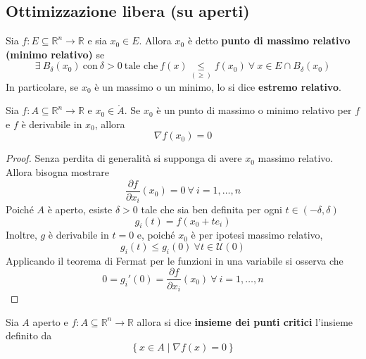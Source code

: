 \subsection{Ottimizzazione libera (su aperti)}
\begin{definition} \label{Def: Max e min relativo}
    Sia $f:E \subseteq \mathbb{R}^n \to \mathbb{R}$ e sia $x_0 \in E$. Allora $x_0$ è detto \textbf{punto di massimo relativo (minimo relativo)} se
    \begin{equation}
        \exists\ B_\delta(x_0)\ \text{con}\ \delta>0\ \text{tale che}\ f(x) \underset{(\geq)}{\leq} f(x_0)\ \forall\ x \in E \cap B_\delta(x_0)
    \end{equation}
    In particolare, se $x_0$ è un massimo o un minimo, lo si dice \textbf{estremo relativo}.
\end{definition}
\begin{theorem}
Sia $f:A \subseteq \mathbb{R}^n  \to \mathbb{R}$ e $x_0 \in \mathring{A}$. Se $x_0$ è un punto di massimo o minimo relativo per $f$ e $f$ è derivabile in $x_0$, allora
\begin{equation}
    \nabla f(x_0)=0
\end{equation}
\begin{proof}
    Senza perdita di generalità si supponga di avere $x_0$ massimo relativo. Allora bisogna mostrare
    \begin{equation}
        \frac{\partial f}{\partial x_i}(x_0)=0\ \forall\ i=1, \dots, n
    \end{equation}
    Poiché $A$ è aperto, esiste $\delta>0$ tale che sia ben definita per ogni $t \in (-\delta, \delta)$
    \begin{equation}
        g_i(t)=f(x_0+t e_i)
    \end{equation}
    Inoltre, $g$ è derivabile in $t=0$ e, poiché $x_0$ è per ipotesi massimo relativo, 
    \begin{equation}
        g_i(t) \leq g_i(0)\ \forall t \in \mathcal{U}(0)
    \end{equation}
    Applicando il teorema di Fermat per le funzioni in una variabile si osserva che
    \begin{equation}
        0=g_i'(0)=\frac{\partial f}{\partial x_i}(x_0)\ \forall\ i=1, \dots, n
    \end{equation}
\end{proof}
\end{theorem}
\begin{definition} \label{Def: Insieme dei punti critici}
    Sia $A$ aperto e $f: A \subseteq \mathbb{R}^n  \to \mathbb{R}$ allora si dice \textbf{insieme dei punti critici} l'insieme definito da
    \begin{equation}
        \left\{x\in A \mid \nabla f(x)=0\right\}
    \end{equation}
\end{definition}
